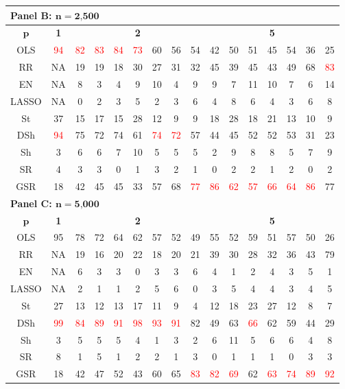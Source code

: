 \begin{table}
{\begin{tabular*}{\textwidth}{@{\extracolsep{\fill}}c|c|ccccccc|ccccccc@{}}
\multicolumn{16}{l}{\textbf{Panel B: $\bm n=\textbf{2,500}$}}\\
\hline
$\bm p$ & \textbf{1} & \multicolumn{7}{c|}{\textbf{2}} & \multicolumn{7}{c}{\textbf{5}} \\
\hline
OLS & \textcolor{red}{94} & \textcolor{red}{82} & \textcolor{red}{83} & \textcolor{red}{84} & \textcolor{red}{73} & 60 & 56 & 54 & 42 & 50 & 51 & 45 & 54 & 36 & 25 \\
RR & NA & 19 & 19 & 18 & 30 & 27 & 31 & 32 & 45 & 39 & 45 & 43 & 49 & 68 & \textcolor{red}{83} \\
EN & NA & 8 & 3 & 4 & 9 & 10 & 4 & 9 & 9 & 7 & 11 & 10 & 7 & 6 & 14 \\
LASSO & NA & 0 & 2 & 3 & 5 & 2 & 3 & 6 & 4 & 8 & 6 & 4 & 3 & 6 & 8 \\
St & 37 & 15 & 17 & 15 & 28 & 12 & 9 & 9 & 18 & 28 & 18 & 21 & 13 & 10 & 9 \\
DSh & \textcolor{red}{94} & 75 & 72 & 74 & 61 & \textcolor{red}{74} & \textcolor{red}{72} & 57 & 44 & 45 & 52 & 52 & 53 & 31 & 23 \\
Sh & 3 & 6 & 6 & 7 & 10 & 5 & 5 & 5 & 2 & 9 & 8 & 8 & 5 & 7 & 9 \\
SR & 4 & 3 & 3 & 0 & 1 & 3 & 2 & 1 & 0 & 2 & 2 & 1 & 2 & 0 & 2 \\
GSR & 18 & 42 & 45 & 45 & 33 & 57 & 68 & \textcolor{red}{77} & \textcolor{red}{86} & \textcolor{red}{62} & \textcolor{red}{57} & \textcolor{red}{66} & \textcolor{red}{64} & \textcolor{red}{86} & 77 \\
\hline

\multicolumn{16}{l}{\textbf{Panel C: $\bm n=\textbf{5,000}$}}\\
\hline
$\bm p$ & \textbf{1} & \multicolumn{7}{c|}{\textbf{2}} & \multicolumn{7}{c}{\textbf{5}} \\
\hline
OLS & 95 & 78 & 72 & 64 & 62 & 57 & 52 & 49 & 55 & 52 & 59 & 51 & 57 & 50 & 26 \\
RR & NA & 19 & 16 & 20 & 22 & 18 & 20 & 21 & 39 & 30 & 28 & 32 & 36 & 43 & 79 \\
EN & NA & 6 & 3 & 3 & 0 & 3 & 3 & 6 & 4 & 1 & 2 & 4 & 3 & 5 & 1 \\
LASSO & NA & 2 & 1 & 1 & 2 & 5 & 6 & 0 & 3 & 5 & 4 & 4 & 3 & 4 & 5 \\
St & 27 & 13 & 12 & 13 & 17 & 11 & 9 & 4 & 12 & 18 & 23 & 27 & 12 & 8 & 7 \\
DSh & \textcolor{red}{99} & \textcolor{red}{84} & \textcolor{red}{89} & \textcolor{red}{91} & \textcolor{red}{98} & \textcolor{red}{93} & \textcolor{red}{91} & 82 & 49 & 63 & \textcolor{red}{66} & 62 & 59 & 44 & 29 \\
Sh & 3 & 5 & 5 & 5 & 4 & 1 & 3 & 2 & 6 & 11 & 5 & 6 & 6 & 4 & 8 \\
SR & 8 & 1 & 5 & 1 & 2 & 2 & 1 & 3 & 0 & 1 & 1 & 1 & 0 & 3 & 3 \\
GSR & 18 & 42 & 47 & 52 & 43 & 60 & 65 & \textcolor{red}{83} & \textcolor{red}{82} & \textcolor{red}{69} & 62 & \textcolor{red}{63} & \textcolor{red}{74} & \textcolor{red}{89} & \textcolor{red}{92} \\
\hline


\end{tabular*}}
\end{table}
